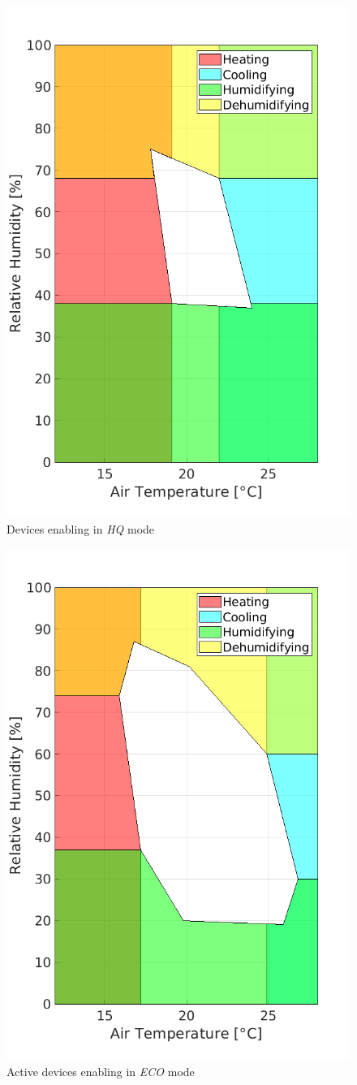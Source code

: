 \documentclass[peerreview]{IEEEtran}
\begin{document}
\begin{figure}[!htbp]
	\centering
	\includegraphics[width=0.7\columnwidth]{comfort_actions} 
	\caption{Devices enabling in \emph{HQ} mode}
	\label{fig:hq_act}
\end{figure}
\begin{figure}[!htbp]
	\centering
	\includegraphics[width=0.7\columnwidth]{still_comfort_actions} 
	\caption{Active devices enabling in \emph{ECO} mode}
	\label{fig:eco_act}
\end{figure}
\end{document}
